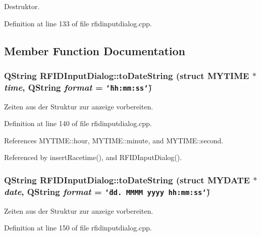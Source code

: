 Destruktor. 



Definition at line 133 of file rfidinputdialog.cpp.

\subsection{Member Function Documentation}
\hypertarget{class_r_f_i_d_input_dialog_f4cc582a23571818a7fa8c796806107f}{
\subsubsection[toDateString]{\setlength{\rightskip}{0pt plus 5cm}QString RFIDInputDialog::toDateString (struct {\bf MYTIME} $\ast$ {\em time}, \/  QString {\em format} = {\tt \char`\"{}hh:mm:ss\char`\"{}})}}
\label{class_r_f_i_d_input_dialog_f4cc582a23571818a7fa8c796806107f}


Zeiten aus der Struktur zur anzeige vorbereiten. 



Definition at line 140 of file rfidinputdialog.cpp.

References MYTIME::hour, MYTIME::minute, and MYTIME::second.

Referenced by insertRacetime(), and RFIDInputDialog().\hypertarget{class_r_f_i_d_input_dialog_20e43f0e0b5830c72b04031d80ed4f08}{
\subsubsection[toDateString]{\setlength{\rightskip}{0pt plus 5cm}QString RFIDInputDialog::toDateString (struct {\bf MYDATE} $\ast$ {\em date}, \/  QString {\em format} = {\tt \char`\"{}dd.~MMMM~yyyy~hh:mm:ss\char`\"{}})}}
\label{class_r_f_i_d_input_dialog_20e43f0e0b5830c72b04031d80ed4f08}


Zeiten aus der Struktur zur anzeige vorbereiten. 



Definition at line 150 of file rfidinputdialog.cpp.

